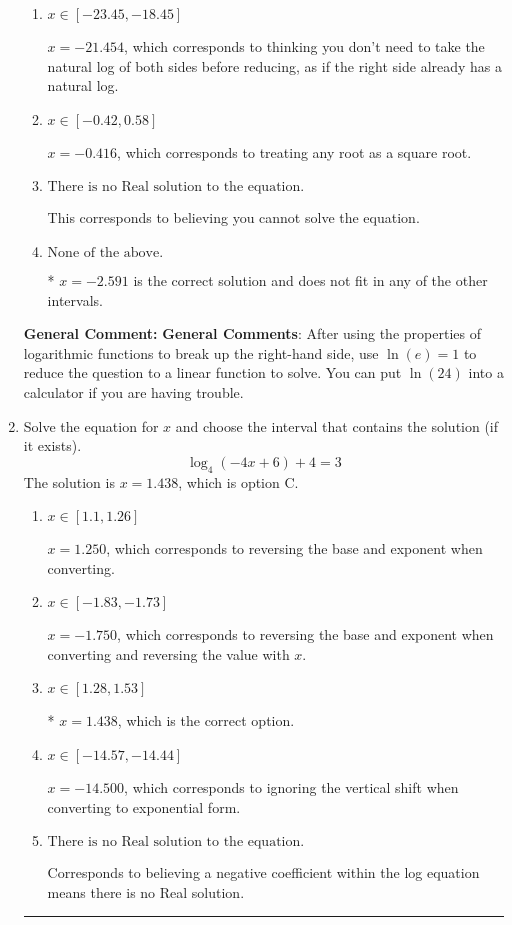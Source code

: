 \documentclass{extbook}[14pt]
\newcommand{\litem}[1]{\item #1

\rule{\textwidth}{0.4pt}}
\begin{document}
\begin{enumerate}
{\begin{enumerate}[label=\Alph*.]
$x = 2.591$, which is the negative of the correct solution.
\item \( x \in [-23.45, -18.45] \)

$x = -21.454$, which corresponds to thinking you don't need to take the natural log of both sides before reducing, as if the right side already has a natural log.
\item \( x \in [-0.42, 0.58] \)

$x = -0.416$, which corresponds to treating any root as a square root.
\item \( \text{There is no Real solution to the equation.} \)

This corresponds to believing you cannot solve the equation.
\item \( \text{None of the above.} \)

* $x = -2.591$ is the correct solution and does not fit in any of the other intervals.
\end{enumerate}

\textbf{General Comment:} \textbf{General Comments}: After using the properties of logarithmic functions to break up the right-hand side, use $\ln(e) = 1$ to reduce the question to a linear function to solve. You can put $\ln(24)$ into a calculator if you are having trouble.
}
\litem{
Solve the equation for $x$ and choose the interval that contains the solution (if it exists).
\[ \log_{4}{(-4x+6)}+4 = 3 \]The solution is \( x = 1.438 \), which is option C.\begin{enumerate}[label=\Alph*.]
\item \( x \in [1.1, 1.26] \)

$x = 1.250$, which corresponds to reversing the base and exponent when converting.
\item \( x \in [-1.83, -1.73] \)

$x = -1.750$, which corresponds to reversing the base and exponent when converting and reversing the value with $x$.
\item \( x \in [1.28, 1.53] \)

* $x = 1.438$, which is the correct option.
\item \( x \in [-14.57, -14.44] \)

$x = -14.500$, which corresponds to ignoring the vertical shift when converting to exponential form.
\item \( \text{There is no Real solution to the equation.} \)

Corresponds to believing a negative coefficient within the log equation means there is no Real solution.
\end{enumerate}

}
\end{enumerate}
\end{document}
